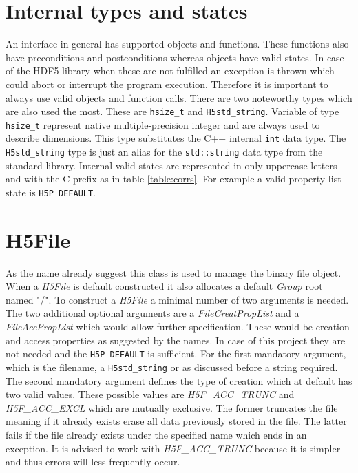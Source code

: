 \section{Internal types and states}
\label{seq:internaltypes}
An interface in general has supported objects and functions. These functions also have preconditions and postconditions whereas objects have valid states. In case of the HDF5 library when these are not fulfilled an exception is thrown which could abort or interrupt the program execution. Therefore it is important to always use valid objects and function calls. There are two noteworthy types which are also used the most. These are \texttt{hsize\_t} and \texttt{H5std\_string}. Variable of type \texttt{hsize\_t} represent native multiple-precision integer and are always used to describe dimensions. This type substitutes the C++ internal \texttt{int} data type. The \texttt{H5std\_string} type is just an alias for the \texttt{std::string} data type from the standard library. Internal valid states are represented in only uppercase letters and with the C prefix as in table \ref{table:corrs}. For example a valid property list state is \texttt{H5P\_DEFAULT}.

\section{H5File}
\label{seq:h5file}
As the name already suggest this class is used to manage the binary file object. When a \textit{H5File} is default constructed it also allocates a default \textit{Group} root named "/". To construct a \textit{H5File} a minimal number of two arguments is needed. The two additional optional arguments are a \textit{FileCreatPropList} and a \textit{FileAccPropList} which would allow further specification. These would be creation and access properties as suggested by the names. In case of this project they are not needed and the \texttt{H5P\_DEFAULT} is sufficient. For the first mandatory argument, which is the filename, a \texttt{H5std\_string} or as discussed before a string required. The second mandatory argument defines the type of creation which at default has two valid values. These possible values are \textit{H5F\_ACC\_TRUNC} and \textit{H5F\_ACC\_EXCL} which are mutually exclusive. The former truncates the file meaning if it already exists erase all data previously stored in the file. The latter fails if the file already exists under the specified name which ends in an exception. It is advised to work with \textit{H5F\_ACC\_TRUNC} because it is simpler and thus errors will less frequently occur.

